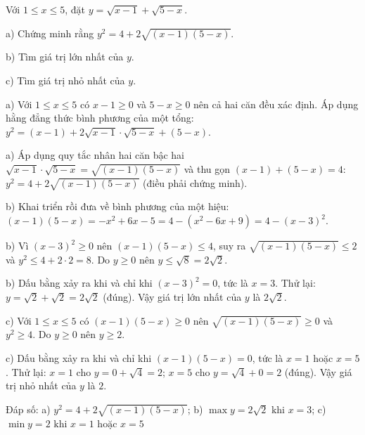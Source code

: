 \begin{problem}[9DS-CAN-051]
Với $1 \leq x \leq 5$, đặt $y = \sqrt{x - 1} + \sqrt{5 - x}$.

a) Chứng minh rằng $y^2 = 4 + 2\sqrt{(x - 1)(5 - x)}$.

b) Tìm giá trị lớn nhất của $y$.

c) Tìm giá trị nhỏ nhất của $y$.

\begin{solution}
a) Với $1 \leq x \leq 5$ có $x - 1 \geq 0$ và $5 - x \geq 0$ nên cả hai căn đều xác định. Áp dụng hằng đẳng thức bình phương của một tổng: $y^2 = (x - 1) + 2\sqrt{x - 1} \cdot \sqrt{5 - x} + (5 - x)$.

a) Áp dụng quy tắc nhân hai căn bậc hai $\sqrt{x - 1} \cdot \sqrt{5 - x} = \sqrt{(x - 1)(5 - x)}$ và thu gọn $(x - 1) + (5 - x) = 4$: $y^2 = 4 + 2\sqrt{(x - 1)(5 - x)}$ (điều phải chứng minh).

b) Khai triển rồi đưa về bình phương của một hiệu: $(x - 1)(5 - x) = -x^2 + 6x - 5 = 4 - (x^2 - 6x + 9) = 4 - (x - 3)^2$.

b) Vì $(x - 3)^2 \geq 0$ nên $(x - 1)(5 - x) \leq 4$, suy ra $\sqrt{(x - 1)(5 - x)} \leq 2$ và $y^2 \leq 4 + 2 \cdot 2 = 8$. Do $y \geq 0$ nên $y \leq \sqrt{8} = 2\sqrt{2}$.

b) Dấu bằng xảy ra khi và chỉ khi $(x - 3)^2 = 0$, tức là $x = 3$. Thử lại: $y = \sqrt{2} + \sqrt{2} = 2\sqrt{2}$ (đúng). Vậy giá trị lớn nhất của $y$ là $2\sqrt{2}$.

c) Với $1 \leq x \leq 5$ có $(x - 1)(5 - x) \geq 0$ nên $\sqrt{(x - 1)(5 - x)} \geq 0$ và $y^2 \geq 4$. Do $y \geq 0$ nên $y \geq 2$.

c) Dấu bằng xảy ra khi và chỉ khi $(x - 1)(5 - x) = 0$, tức là $x = 1$ hoặc $x = 5$. Thử lại: $x = 1$ cho $y = 0 + \sqrt{4} = 2$; $x = 5$ cho $y = \sqrt{4} + 0 = 2$ (đúng). Vậy giá trị nhỏ nhất của $y$ là $2$.

Đáp số: a) $\boxed{y^2 = 4 + 2\sqrt{(x - 1)(5 - x)}}$; b) $\boxed{\max y = 2\sqrt{2} \text{ khi } x = 3}$; c) $\boxed{\min y = 2 \text{ khi } x = 1 \text{ hoặc } x = 5}$
\end{solution}
\end{problem}


